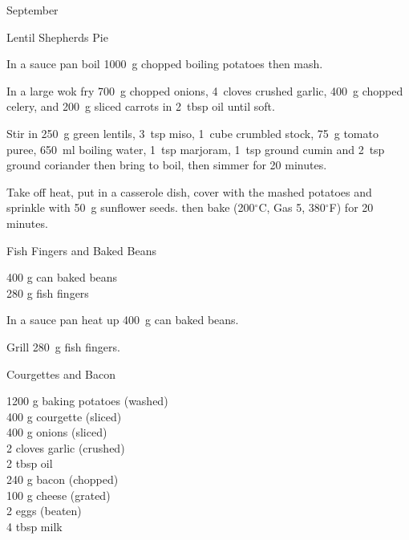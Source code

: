 \begin{menu}{September}
\begin{recipe}{2}{Lentil Shepherds Pie}
    \begin{instructions}
    \item 
        In a sauce pan boil
        1000~g chopped boiling potatoes
        then mash.
      \item 
        In a large wok fry
        700~g chopped onions,
        4~cloves crushed garlic,
        400~g chopped celery,
        and
        200~g sliced carrots
        in
        2~tbsp  oil
        until soft.
      \item 
        Stir in
        250~g  green lentils,
        3~tsp  miso,
        1~cube crumbled stock,
        75~g  tomato puree,
        650~ml  boiling water,
        1~tsp  marjoram,
        1~tsp  ground cumin
        and
        2~tsp  ground coriander
        then bring to boil,
        then simmer for 20 minutes.
      \item 
        Take off heat,
        put in a casserole dish,
        cover with the mashed potatoes
        and sprinkle with
        50~g  sunflower seeds.
        then bake (200$^{\circ}$C, Gas 5, 380$^{\circ}$F) for 20 minutes.
      
    \end{instructions}
    \end{recipe}%
  
    \begin{recipe}{1}{Fish Fingers and Baked Beans}%
		\begin{ingredients}
		400 g can baked beans  \\
	280 g fish fingers  \\
	
		\end{ingredients}
	
	
    \begin{instructions}
    \item 
        In a sauce pan heat up
        400~g  can baked beans.
      \item 
        Grill
        280~g  fish fingers.
      
    \end{instructions}
    \end{recipe}%
  
    \begin{recipe}{2}{Courgettes and Bacon}%
		\begin{ingredients}
		1200 g baking potatoes (washed) \\
	400 g courgette (sliced) \\
	400 g onions (sliced) \\
	2 cloves garlic (crushed) \\
	2 tbsp oil  \\
	240 g bacon (chopped) \\
	100 g cheese (grated) \\
	2  eggs (beaten) \\
	4 tbsp milk  \\
	

\end{ingredients}
\end{recipe}
\end{menu}

